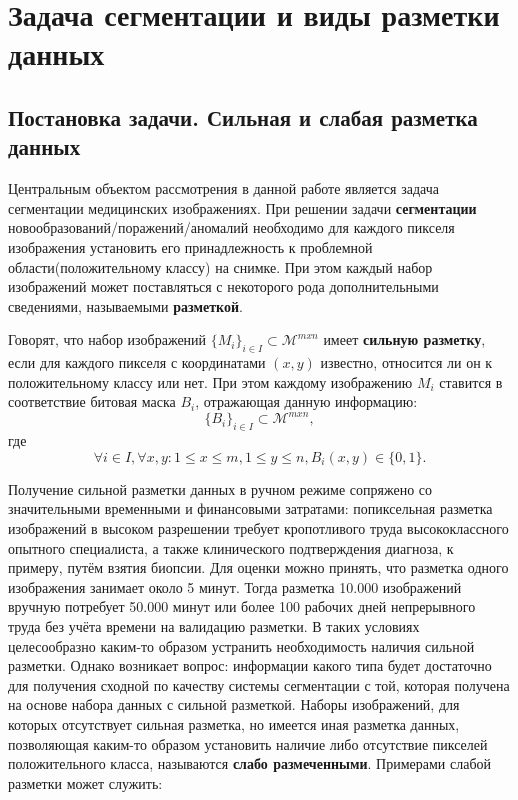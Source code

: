 \chapter{Задача сегментации и виды разметки данных} \label{chapt1}


\section{Постановка задачи. Сильная и слабая разметка данных}
Центральным объектом рассмотрения в данной работе является задача сегментации медицинских изображениях.
При решении задачи {\bf сегментации}  новообразований/поражений/аномалий необходимо для каждого пикселя изображения установить его принадлежность к проблемной области(положительному классу) на снимке. При этом каждый набор изображений может поставляться с некоторого рода дополнительными сведениями, называемыми {\bf разметкой}.

Говорят, что набор изображений $\{M_i\}_{i\in I}\subset \mathcal{M}^{mxn}$ имеет {\bf сильную разметку}, если для каждого пикселя с координатами $(x,y)$ известно, относится ли он к положительному классу или нет. При этом каждому изображению $M_i$ ставится в соответствие битовая маска $B_i$, отражающая данную информацию: $$\{B_i\}_{i\in I} \subset \mathcal{M}^{mxn},$$ где $$\forall i \in I,  \forall x,y: 1\le x \le m, 1\le y \le n, B_i(x,y) \in \{0,1\}.$$

Получение сильной разметки данных в ручном режиме сопряжено со значительными временными и финансовыми затратами: попиксельная разметка изображений в высоком разрешении требует кропотливого труда высококлассного опытного специалиста, а также клинического подтверждения диагноза, к примеру, путём взятия биопсии. Для оценки можно принять, что разметка одного изображения занимает около 5 минут. Тогда разметка 10.000 изображений вручную потребует 50.000 минут или более 100 рабочих дней непрерывного труда без учёта времени на валидацию разметки. В таких условиях целесообразно каким-то образом устранить необходимость наличия сильной разметки. Однако возникает вопрос: информации какого типа будет достаточно для получения сходной по качеству системы сегментации с той, которая получена на основе набора данных с сильной разметкой. Наборы изображений, для которых отсутствует сильная разметка, но имеется иная разметка данных, позволяющая каким-то образом установить наличие либо отсутствие пикселей положительного класса, называются {\bf слабо размеченными}. Примерами слабой разметки может служить:

